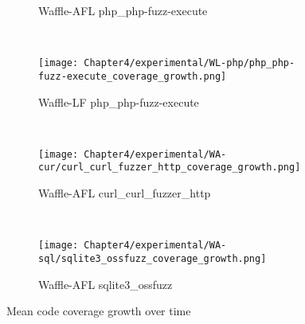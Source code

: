 \begin{figure}[!t]
\begin{adjustbox}{center,max width=1.3\textwidth}
\begin{subfigure}[t]{0.55\textwidth}
            \vspace*{-5mm}
            \caption{Waffle-AFL php\_php-fuzz-execute}
            \label{gro:c}
            \vspace*{5mm}
        \end{subfigure}
        ~
        \begin{subfigure}[t]{0.55\textwidth}
            \centering
            \texttt{[image: Chapter4/experimental/WL-php/php\_php-fuzz-execute\_coverage\_growth.png]}
            \vspace*{-5mm}
            \caption{Waffle-LF php\_php-fuzz-execute}
            \label{gro:g}
            \vspace*{5mm}
        \end{subfigure}
    \end{adjustbox}
    ~
    \begin{adjustbox}{center,max width=1.3\textwidth}
        \begin{subfigure}[t]{0.55\textwidth}
            \centering
            \texttt{[image: Chapter4/experimental/WA-cur/curl\_curl\_fuzzer\_http\_coverage\_growth.png]}
            \vspace*{-5mm}
            \caption{Waffle-AFL curl\_curl\_fuzzer\_http}
            \label{gro:a}
            \vspace*{5mm}
        \end{subfigure}
        ~
        \begin{subfigure}[t]{0.55\textwidth}
            \centering
            \texttt{[image: Chapter4/experimental/WA-sql/sqlite3\_ossfuzz\_coverage\_growth.png]}
            \vspace*{-5mm}
            \caption{Waffle-AFL sqlite3\_ossfuzz}
            \label{gro:d}
            \vspace*{5mm}
        \end{subfigure}
    \end{adjustbox}
    \caption{Mean code coverage growth over time}
    \label{fig:report-log}
\end{figure}



